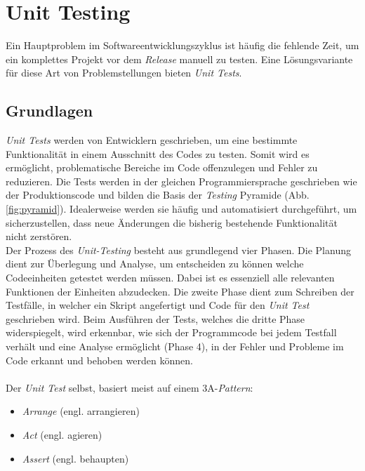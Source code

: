 \section{Unit Testing}
Ein Hauptproblem im Softwareentwicklungszyklus ist häufig die fehlende Zeit, um ein komplettes Projekt vor dem \textit{Release} manuell zu testen. \cite*{SoftwareQualityLab} Eine Lösungsvariante für diese Art von Problemstellungen bieten \textit{Unit Tests}.

\subsection{Grundlagen}
\textit{Unit Tests} werden von Entwicklern geschrieben, um eine bestimmte Funktionalität in einem Ausschnitt des Codes zu testen. Somit wird es ermöglicht, problematische Bereiche im Code offenzulegen und Fehler zu reduzieren. \cite*{tosunEffectivenessUnitTests2018} Die Tests werden in der gleichen Programmiersprache geschrieben wie der Produktionscode und bilden die Basis der \textit{Testing} Pyramide (Abb. \ref{fig:pyramid}). Idealerweise werden sie häufig und automatisiert durchgeführt, um sicherzustellen, dass neue Änderungen die bisherig bestehende Funktionalität nicht zerstören. \cite*{TestingPyramidStrategic2024}\\
Der Prozess des \textit{Unit-Testing} besteht aus grundlegend vier Phasen. Die Planung dient zur Überlegung und Analyse, um entscheiden zu können welche Codeeinheiten getestet werden müssen. Dabei ist es essenziell alle relevanten Funktionen der Einheiten abzudecken. \cite*{bakharevUnitTestingDefinition2023} Die zweite Phase dient zum Schreiben der Testfälle, in welcher ein Skript angefertigt und Code für den \textit{Unit Test} geschrieben wird. \cite*{bakharevUnitTestingDefinition2023} Beim Ausführen der Tests, welches die dritte Phase widerspiegelt, wird erkennbar, wie sich der Programmcode bei jedem Testfall verhält und eine Analyse ermöglicht (Phase 4), in der Fehler und Probleme im Code erkannt und behoben werden können.\cite*{bakharevUnitTestingDefinition2023}\\\\
Der \textit{Unit Test} selbst, basiert meist auf einem 3A-\textit{Pattern}:
\begin{itemize}
    \setlength{\parskip}{0.5pt}
    \item \textit{Arrange} (engl. arrangieren)
    \item \textit{Act} (engl. agieren)
    \item \textit{Assert} (engl. behaupten)
\end{itemize}

